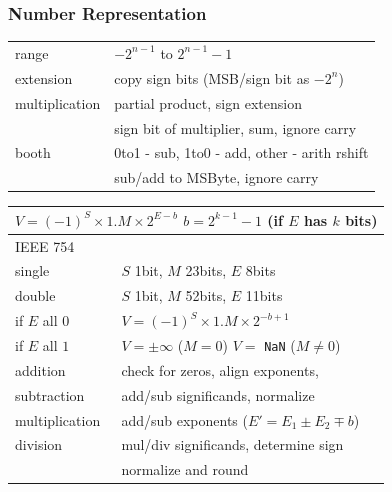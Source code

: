 \documentclass[10pt]{article}
\newcommand{\code}[1]{\texttt{#1}}
\begin{document}
\begin{multicols*}{2}
    \subsubsection*{Number Representation}
    \begin{tcolorbox}[title=2's Complement]
        \begin{tabular}{ll}
            range          & $-2^{n-1}$ to $2^{n-1} - 1$                  \\
            extension      & copy sign bits (MSB/sign bit as $-2^n$)      \\
            multiplication & partial product, sign extension              \\
            ~              & sign bit of multiplier, sum, ignore carry    \\
            booth          & 0to1 - sub, 1to0 - add, other - arith rshift \\
            ~              & sub/add to MSByte, ignore carry              \\
        \end{tabular}
    \end{tcolorbox}

    \begin{tcolorbox}[title=Floating Point]
        \begin{tabular}{ll}
            \multicolumn{2}{l}{$V = (-1)^S \times 1.M \times 2^{E - b}$  $b = 2^{k-1} - 1$ (if $E$ has $k$ bits)} \\
            \hline
            IEEE 754       & ~                                                                                    \\
            single         & $S$ 1bit, $M$ 23bits, $E$ 8bits                                                      \\
            double         & $S$ 1bit, $M$ 52bits, $E$ 11bits                                                     \\
            if $E$ all $0$ & $V = (-1)^S \times 1.M \times 2^{- b + 1}$                                           \\
            if $E$ all $1$ & $V = \pm\infty$ ($M = 0$) $V = $ \code{NaN} ($M \ne 0$)                              \\
            \hline
            addition       & check for zeros, align exponents,                                                    \\
            subtraction    & add/sub significands, normalize                                                      \\
            \hline
            multiplication & add/sub exponents ($E' = E_1 \pm E_2 \mp b$)                                         \\
            division       & mul/div significands, determine sign                                                 \\
            ~              & normalize and round                                                                  \\
        \end{tabular}
    \end{tcolorbox}


\end{multicols*}
\end{document}

